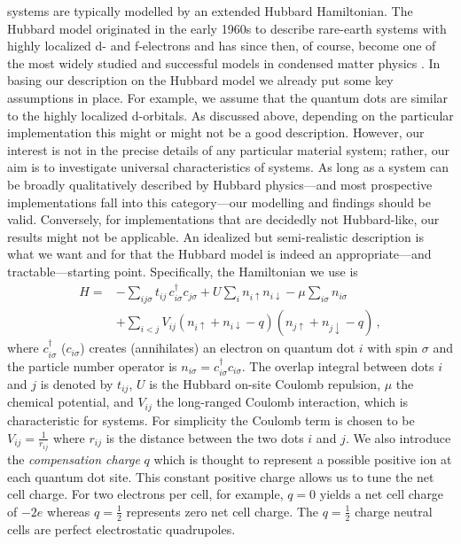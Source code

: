  systems are typically modelled by an extended Hubbard Hamiltonian.
The Hubbard model originated in the early 1960s to describe rare-earth systems
with highly localized d- and f-electrons and has since then, of course, become
one of the most widely studied and successful models in condensed matter physics
\cite{Hubbard1964}. In basing our description on the Hubbard model we already
put some key assumptions in place. For example, we assume that the quantum dots
are similar to the highly localized d-orbitals. As discussed above, depending on
the particular  implementation this might or might not be a good
description. However, our interest is not in the precise details of any
particular material system; rather, our aim is to investigate universal
characteristics of  systems. As long as a  system can be
broadly qualitatively described by Hubbard physics---and most prospective
 implementations fall into this category---our modelling and findings
should be valid. Conversely, for implementations that are decidedly not
Hubbard-like, our results might not be applicable. An idealized but
semi-realistic description is what we want and for that the Hubbard model is
indeed an appropriate---and tractable---starting point. Specifically, the
Hamiltonian we use is
\begin{equation}
\begin{split}
  \label{eq:H_QCA}
  H =
    &- \sum_{ij\sigma} t_{ij} \, c^{\dagger}_{i\sigma} c_{j\sigma}
    + U \sum_i n_{i\uparrow} n_{i\downarrow}
    - \mu \sum_{i\sigma} n_{i\sigma} \\
    &+ \sum_{i<j} V_{ij} \left( n_{i\uparrow} + n_{i\downarrow} - q \right) 
                        \left( n_{j\uparrow} + n_{j\downarrow} - q \right) \, ,
\end{split}
\end{equation}
where $c^{\dagger}_{i\sigma}$ ($c_{i\sigma}$) creates (annihilates) an electron
on quantum dot $i$ with spin $\sigma$ and the particle number operator is
$n_{i\sigma} = c^{\dagger}_{i\sigma} c_{i\sigma}$. The overlap integral between
dots $i$ and $j$ is denoted by $t_{ij}$, $U$ is the Hubbard on-site Coulomb
repulsion, $\mu$ the chemical potential, and $V_{ij}$ the long-ranged Coulomb
interaction, which is characteristic for  systems. For simplicity the
Coulomb term is chosen to be $V_{ij} = \frac{1}{r_{ij}}$ where $r_{ij}$ is the
distance between the two dots $i$ and $j$. We also introduce the
\emph{compensation charge} $q$ which is thought to represent a possible positive
ion at each quantum dot site. This constant positive charge allows us to tune
the net cell charge. For two electrons per cell, for example, $q=0$ yields a net
cell charge of $-2e$ whereas $q = \frac{1}{2}$ represents zero net cell charge.
The $q = \frac{1}{2}$ charge neutral cells are perfect electrostatic
quadrupoles.

